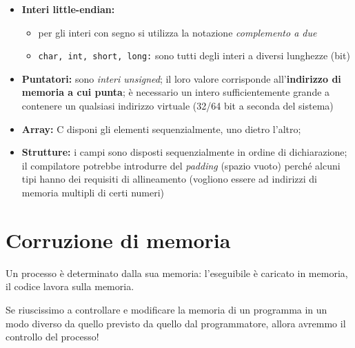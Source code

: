 \begin{itemize}
    \item \textbf{Interi little-endian:}
    \begin{itemize}
        \item per gli interi con segno si utilizza la notazione \textit{complemento a due}
        \item \texttt{char, int, short, long:} sono tutti degli interi a diversi lunghezze (bit)
    \end{itemize}
    \item \textbf{Puntatori:} sono \textit{interi unsigned}; il loro valore corrisponde all'\textbf{indirizzo di memoria
    a cui punta}; è necessario un intero sufficientemente grande a contenere un qualsiasi indirizzo virtuale (32/64 bit a seconda del sistema)
    \item \textbf{Array:} C disponi gli elementi sequenzialmente, uno dietro l'altro;
    \item \textbf{Strutture:} i campi sono disposti sequenzialmente in ordine di dichiarazione; il compilatore potrebbe
    introdurre del \textit{padding} (spazio vuoto) perché alcuni tipi hanno dei requisiti di allineamento (vogliono essere ad indirizzi di memoria multipli di certi numeri)
\end{itemize}

\section{Corruzione di memoria}

Un processo è determinato dalla sua memoria: l'eseguibile è caricato in memoria, il codice lavora sulla memoria.

Se riuscissimo a controllare e modificare la memoria di un programma in un modo diverso
da quello previsto da quello dal programmatore, allora avremmo il controllo del processo!





